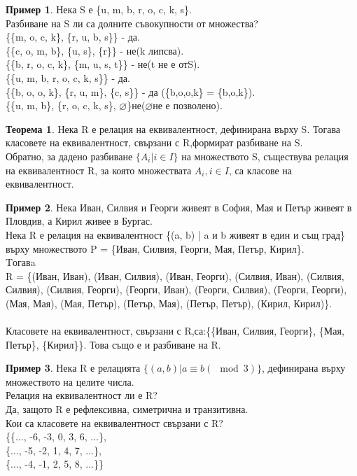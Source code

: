 \documentclass[fleqn, 12pt]{article}
\theoremstyle{definition}
\newtheorem{example}{Пример}[subsection]
\newtheorem{theorem}{Теорема}[subsection]
\begin{document}
\begin{example}
Нека S е \{u, m, b, r, o, c, k, s\}.\\
Разбиване на S ли са долните съвокупности от множества?\\
\{\{m, o, c, k\}, \{r, u, b, s\}\} - да.\\
\{\{c, o, m, b\}, \{u, s\}, \{r\}\} - не(k липсва).\\
\{\{b, r, o, c, k\}, \{m, u, s, t\}\} - не(t не е отS).\\
\{\{u, m, b, r, o, c, k, s\}\} - да.\\
\{\{b, o, o, k\}, \{r, u, m\}, \{c, s\}\} - да (\{b,o,o,k\} = \{b,o,k\}).\\
\{\{u, m, b\}, \{r, o, c, k, s\}, $\varnothing$\}не($\varnothing$не е позволено).
\end{example}

\begin{theorem}
Нека R е релация на еквивалентност, дефинирана върху S. Тогава класовете на еквивалентност, свързани с R,формират разбиване на S.\\
Обратно, за дадено разбиване $\{A_i | i \in I\}$ на множеството S, съществува релация на еквивалентност R, за която множествата $A_i, i \in I$, са класове на еквивалентност.
\end{theorem}

\begin{example}
Нека Иван, Силвия и Георги живеят в  София, Мая и Петър  живеят в Пловдив, а Кирил живее в Бургас. \\
Нека R е релация на еквивалентност \{(a, b) | a и b живеят в един и същ град\} върху множеството P = \{Иван, Силвия,   Георги, Мая,  Петър, Кирил\}.\\
Tогавa \\
R = \{(Иван, Иван),\;
(Иван, Силвия),\;
(Иван, Георги),\;
(Силвия, Иван),\;
(Силвия, Силвия),\;
(Силвия, Георги),\;
(Георги, Иван),\;
(Георги, Силвия),\;
(Георги, Георги),\;
(Мая, Мая), \;
(Мая, Петър), \;
(Петър, Мая),\;
(Петър, Петър),\;
(Кирил, Кирил)\}.\\
\\
Класовете на еквивалентност, свързани с R,са:\{\{Иван, Силвия, Георги\},\; \{Мая,  Петър\},\; \{Кирил\}\}. Това също е и разбиване на R.

\end{example}

\begin{example}
Нека R е релацията $\{(a, b) | a \equiv b (\mod 3)\}$, дефинирана върху множеството на целите числа.\\
Релация на еквивалентност ли е R?\\
Да, защото R е рефлексивна, симетрична и транзитивна. \\
Кои са класовете на еквивалентност свързани с R?\\
\{\{..., -6,   -3, 0, 3, 6, ...\},\\
\{..., -5,   -2, 1, 4, 7, ...\},\\
\{..., -4,   -1, 2, 5, 8, ...\}\}
\end{example}
\end{document}
